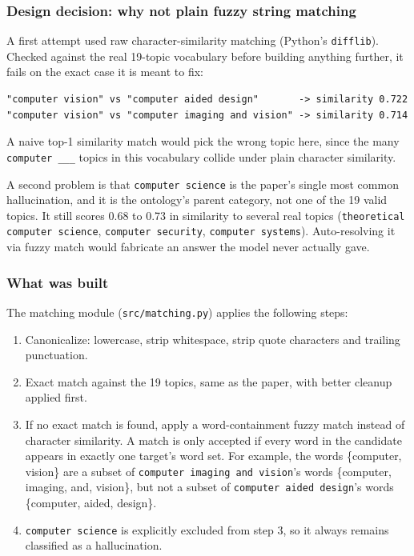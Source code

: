 \subsubsection{Design decision: why not plain fuzzy string matching}

A first attempt used raw character-similarity matching (Python's \texttt{difflib}). Checked against the real 19-topic vocabulary before building anything further, it fails on the exact case it is meant to fix:

\begin{verbatim}
"computer vision" vs "computer aided design"       -> similarity 0.722
"computer vision" vs "computer imaging and vision" -> similarity 0.714
\end{verbatim}

A naive top-1 similarity match would pick the wrong topic here, since the many \texttt{computer \_\_\_} topics in this vocabulary collide under plain character similarity.

A second problem is that \texttt{computer science} is the paper's single most common hallucination, and it is the ontology's parent category, not one of the 19 valid topics. It still scores 0.68 to 0.73 in similarity to several real topics (\texttt{theoretical computer science}, \texttt{computer security}, \texttt{computer systems}). Auto-resolving it via fuzzy match would fabricate an answer the model never actually gave.

\subsubsection{What was built}

The matching module (\texttt{src/matching.py}) applies the following steps:

\begin{enumerate}
    \item Canonicalize: lowercase, strip whitespace, strip quote characters and trailing punctuation.
    \item Exact match against the 19 topics, same as the paper, with better cleanup applied first.
    \item If no exact match is found, apply a word-containment fuzzy match instead of character similarity. A match is only accepted if every word in the candidate appears in exactly one target's word set. For example, the words \{computer, vision\} are a subset of \texttt{computer imaging and vision}'s words \{computer, imaging, and, vision\}, but not a subset of \texttt{computer aided design}'s words \{computer, aided, design\}.
    \item \texttt{computer science} is explicitly excluded from step 3, so it always remains classified as a hallucination.
\end{enumerate}

